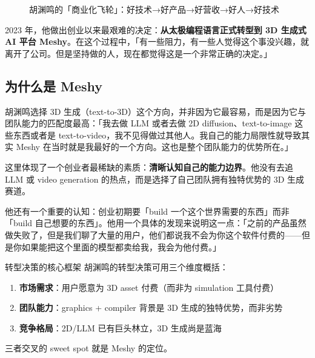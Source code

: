 \documentclass[a4paper]{article}
\begin{document}
\begin{figure}[H]
\centering
{}
\caption{胡渊鸣的「商业化飞轮」：好技术→好产品→好营收→好人→好技术}
\label{fig:flywheel}
\end{figure}

2023 年，他做出创业以来最艰难的决定：\textbf{从太极编程语言正式转型到 3D 生成式 AI 平台 Meshy}。在这个过程中，「有一些阻力，有一些人觉得这个事没兴趣，就离开了公司。但是坚持做的人，现在都觉得这是一个非常正确的决定。」

\subsection{为什么是 Meshy}

胡渊鸣选择 3D 生成（text-to-3D）这个方向，并非因为它最容易，而是因为它与团队能力的匹配度最高：「我去做 LLM 或者去做 2D diffusion、text-to-image 这些东西或者是 text-to-video，我不见得做过其他人。我自己的能力局限性就导致其实 Meshy 在当时就是我最好的一个方向。这也是整个团队能力的优势所在。」

这里体现了一个创业者最稀缺的素质：\textbf{清晰认知自己的能力边界}。他没有去追 LLM 或 video generation 的热点，而是选择了自己团队拥有独特优势的 3D 生成赛道。

他还有一个重要的认知：创业初期要「build 一个这个世界需要的东西」而非「build 自己想要的东西」。他用一个具体的发现来说明这一点：「之前的产品虽然做失败了，但是我们聊了大量的用户，他们都说我不会为你这个软件付费的——但是你如果能把这个里面的模型都卖给我，我会为他付费。」

\begin{importantbox}{转型决策的核心框架}
胡渊鸣的转型决策可用三个维度概括：
\begin{enumerate}
    \item \textbf{市场需求}：用户愿意为 3D asset 付费（而非为 simulation 工具付费）
    \item \textbf{团队能力}：graphics + compiler 背景是 3D 生成的独特优势，而非劣势
    \item \textbf{竞争格局}：2D/LLM 已有巨头林立，3D 生成尚是蓝海
\end{enumerate}
三者交叉的 sweet spot 就是 Meshy 的定位。
\end{importantbox}
\end{document}
